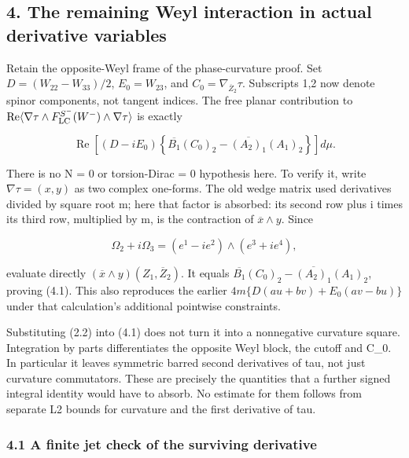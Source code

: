 \documentclass[
  10pt,
]{article}
\begin{document}
\hypertarget{the-remaining-weyl-interaction-in-actual-derivative-variables}{%
\subsection{4. The remaining Weyl interaction in actual derivative
variables}\label{the-remaining-weyl-interaction-in-actual-derivative-variables}}

Retain the opposite-Weyl frame of the phase-curvature proof. Set
\(D=(W_{22}-W_{33})/2\), \(E_0=W_{23}\), and
\(C_0=\nabla_{\overline Z_2}\tau\). Subscripts 1,2 now denote spinor
components, not tangent indices. The free planar contribution to
\(\operatorname{Re}\langle\nabla\tau\wedge  F_{\rm LC}^{S^-}(W^-)\wedge\nabla\tau\rangle\)
is exactly

\[
 \boxed{\operatorname{Re}\left[(D-iE_0)
    \left\{\overline{B_1}(C_0)_2
       -\overline{(A_2)_1}(A_1)_2\right\}\right]d\mu.}   \tag{4.1}
\]

There is no N = 0 or torsion-Dirac = 0 hypothesis here. To verify it,
write \(\nabla\tau=(x,y)\) as two complex one-forms. The old wedge
matrix used derivatives divided by square root m; here that factor is
absorbed: its second row plus i times its third row, multiplied by m, is
the contraction of \(\overline x\wedge y\). Since

\[
 \Omega_2+i\Omega_3=(e^1-ie^2)\wedge(e^3+ie^4),
\]

evaluate directly \((\overline x\wedge y)(Z_1,\overline Z_2)\). It
equals \(\overline{B_1}(C_0)_2-\overline{(A_2)_1}(A_1)_2\), proving
(4.1). This also reproduces the earlier \(4m\{D(au+bv)+E_0(av-bu)\}\)
under that calculation's additional pointwise constraints.

Substituting (2.2) into (4.1) does not turn it into a nonnegative
curvature square. Integration by parts differentiates the opposite Weyl
block, the cutoff and C\_0. In particular it leaves symmetric barred
second derivatives of tau, not just curvature commutators. These are
precisely the quantities that a further signed integral identity would
have to absorb. No estimate for them follows from separate L2 bounds for
curvature and the first derivative of tau.

\hypertarget{a-finite-jet-check-of-the-surviving-derivative}{%
\subsubsection{4.1 A finite jet check of the surviving
derivative}\label{a-finite-jet-check-of-the-surviving-derivative}}
\end{document}
